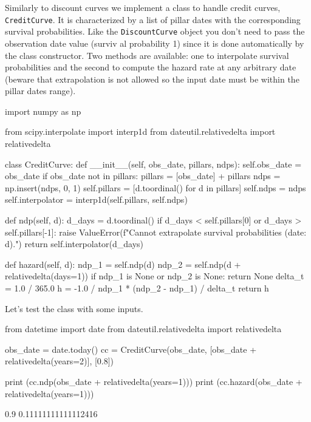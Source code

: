 \begin{finmarkets}
	Similarly to discount curves we implement a class to handle credit curves, \texttt{CreditCurve}. It is characterized by a list of pillar dates with the corresponding survival probabilities. Like the \texttt{DiscountCurve} object you don't need to pass the observation date value (surviv
	al probability 1) since it is done automatically by the class constructor. Two methods are available: one to interpolate survival probabilities and the second to compute the hazard rate at any arbitrary date (beware that extrapolation is not allowed so the input date must be within the pillar dates range).
\end{finmarkets}

\begin{ipython}
import numpy as np

from scipy.interpolate import interp1d
from dateutil.relativedelta import relativedelta

class CreditCurve:
    def __init__(self, obs_date, pillars, ndps):
        self.obs_date = obs_date
        if obs_date not in pillars:
            pillars = [obs_date] + pillars
            ndps = np.insert(ndps, 0, 1)
        self.pillars = [d.toordinal() for d in pillars]
        self.ndps = ndps
        self.interpolator = interp1d(self.pillars, self.ndps)
        
    def ndp(self, d):
        d_days = d.toordinal()
        if d_days < self.pillars[0] or d_days > self.pillars[-1]:
            raise ValueError(f"Cannot extrapolate survival probabilities (date: {d}).")
        return self.interpolator(d_days)
    
    def hazard(self, d):
        ndp_1 = self.ndp(d)
        ndp_2 = self.ndp(d + relativedelta(days=1))
        if ndp_1 is None or ndp_2 is None:
            return None
        delta_t = 1.0 / 365.0
        h = -1.0 / ndp_1 * (ndp_2 - ndp_1) / delta_t
        return h
\end{ipython}

Let's test the class with some inputs.
\begin{ipython}
from datetime import date
from dateutil.relativedelta import relativedelta

obs_date = date.today()
cc = CreditCurve(obs_date, [obs_date + relativedelta(years=2)], [0.8])

print (cc.ndp(obs_date + relativedelta(years=1)))
print (cc.hazard(obs_date + relativedelta(years=1)))
\end{ipython}
\begin{ioutput}
0.9
0.11111111111112416
\end{ioutput}

